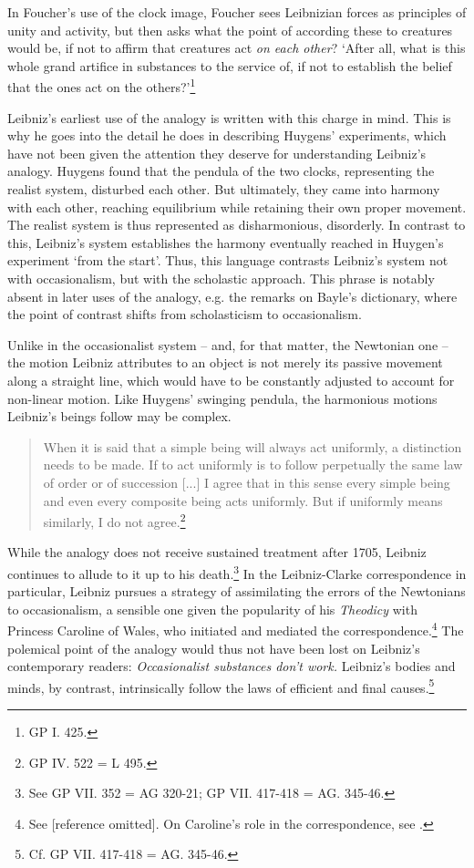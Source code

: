 \documentclass{article}
\begin{document}
In Foucher's use of the clock image, Foucher sees Leibnizian forces as
principles of unity and activity, but then asks what the point of
according these to creatures would be, if not to affirm that creatures
act \emph{on each other}? `After all, what is this whole grand artifice
in substances to the service of, if not to establish the belief that the
ones act on the others?'\footnote{GP I. 425.}

Leibniz's earliest use of the analogy is written with this charge in
mind. This is why he goes into the detail he does in describing Huygens'
experiments, which have not been given the attention they deserve for
understanding Leibniz's analogy. Huygens found that the pendula of the
two clocks, representing the realist system, disturbed each other. But
ultimately, they came into harmony with each other, reaching equilibrium
while retaining their own proper movement. The realist system is thus
represented as disharmonious, disorderly. In contrast to this, Leibniz's
system establishes the harmony eventually reached in Huygen's experiment
`from the start'. Thus, this language contrasts Leibniz's system not
with occasionalism, but with the scholastic approach. This phrase is
notably absent in later uses of the analogy, e.g. the remarks on Bayle's
dictionary, where the point of contrast shifts from scholasticism to
occasionalism.

Unlike in the occasionalist system -- and, for that matter, the
Newtonian one -- the motion Leibniz attributes to an object is not
merely its passive movement along a straight line, which would have to
be constantly adjusted to account for non-linear motion. Like Huygens'
swinging pendula, the harmonious motions Leibniz's beings follow may be
complex.

\begin{quote}
When it is said that a simple being will always act uniformly, a
distinction needs to be made. If to act uniformly is to follow
perpetually the same law of order or of succession {[}...{]} I agree
that in this sense every simple being and even every composite being
acts uniformly. But if uniformly means similarly, I do not
agree.\footnote{GP IV. 522 = L 495.}
\end{quote}

While the analogy does not receive sustained treatment after 1705,
Leibniz continues to allude to it up to his death.\footnote{See GP VII.
  352 = AG 320-21; GP VII. 417-418 = AG. 345-46.} In the Leibniz-Clarke
correspondence in particular, Leibniz pursues a strategy of assimilating
the errors of the Newtonians to occasionalism, a sensible one given the
popularity of his \emph{Theodicy} with Princess Caroline of Wales, who
initiated and mediated the correspondence.\footnote{See {[}reference
  omitted{]}. On Caroline's role in the correspondence, see
  \autocite{Bertoloni-Meli1999}.} The polemical point of the analogy would thus
not have been lost on Leibniz's contemporary readers:
\emph{Occasionalist substances don't work.} Leibniz's bodies and minds,
by contrast, intrinsically follow the laws of efficient and final
causes.\footnote{Cf. GP VII. 417-418 = AG. 345-46.}
\end{document}
